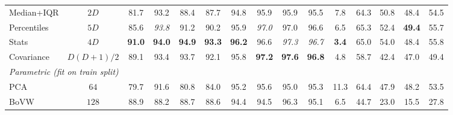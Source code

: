 \begin{table}[t]
\begin{tabular}{lccccc|cccc|c|cccc}
    Median+IQR      & $2D$             & 81.7 & 93.2 & 88.4 & 87.7 & 94.8 & 95.9 & 95.9 & 95.5 & 7.8 & 64.3 & 50.8 & 48.4 & 54.5 \\
    Percentiles     & $5D$             & 85.6 & \textit{93.8} & 91.2 & 90.2 & 95.9 & \textit{97.0} & 97.0 & 96.6 & 6.5 & 65.3 & 52.4 & \textbf{49.4} & 55.7 \\
    \rowcolor{green!10}
    Stats           & $4D$             & \textbf{91.0} & \textbf{94.0} & \textbf{94.9} & \textbf{93.3} & \textbf{96.2} & 96.6 & \textit{97.3} & \textit{96.7} & \textbf{3.4} & 65.0 & 54.0 & 48.4 & 55.8 \\
    Covariance      & $D(D{+}1)/2$     & 89.1 & 93.4 & 93.7 & 92.1 & 95.8 & \textbf{97.2} & \textbf{97.6} & \textbf{96.8} & 4.8 & 58.7 & 42.4 & 47.0 & 49.4 \\
    \midrule
    \multicolumn{15}{l}{\textit{Parametric (fit on train split)}} \\[2pt]
    PCA             & $64$             & 79.7 & 91.6 & 80.8 & 84.0 & 95.2 & 95.6 & 95.0 & 95.3 & 11.3 & 64.4 & 47.9 & 48.2 & 53.5 \\
    BoVW            & $128$            & 88.9 & 88.2 & 88.7 & 88.6 & 94.4 & 94.5 & 96.3 & 95.1 & 6.5  & 44.7 & 23.0 & 15.5 & 27.8 \\
    \bottomrule
  \end{tabular}
\end{table}
